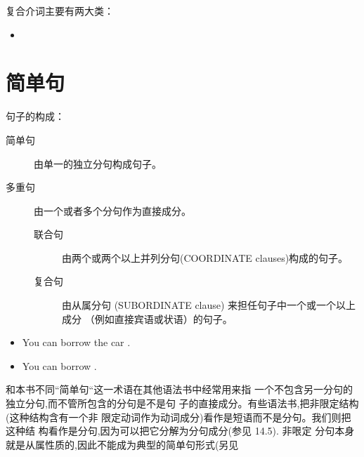 复合介词主要有两大类：
\begin{itemize}
\item
\end{itemize}

\section{简单句}

句子的构成：
\begin{description}
\item[简单句] 由单一的独立分句构成句子。
\item[多重句] 由一个或者多个分句作为直接成分。
  \begin{description}
  \item [联合句] 由两个或两个以上并列分句(COORDINATE clauses)构成的句子。
  \item [复合句] 由从属分句 (SUBORDINATE clause) 来担任句子中一个或一个以上成分
    （例如直接宾语或状语）的句子。
  \end{description}
\end{description}

\begin{itemize}
\item You can borrow the car .
\item You can borrow .
\end{itemize}

和本书不同“简单句“这一术语在其他语法书中经常用来指
一个不包含另一分句的独立分句,而不管所包含的分句是不是句
子的直接成分。有些语法书,把非限定结构(这种结构含有一个非
限定动词作为动词成分)看作是短语而不是分句。我们则把这种结
构看作是分句,因为可以把它分解为分句成分(参见 14.5). 非哏定
分句本身就是从属性质的,因此不能成为典型的简单句形式(另见














